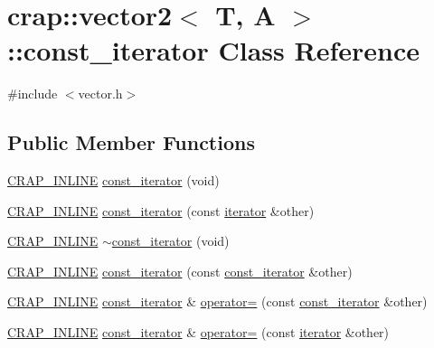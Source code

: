 \hypertarget{classcrap_1_1vector2_1_1const__iterator}{\section{crap\+:\+:vector2$<$ T, A $>$\+:\+:const\+\_\+iterator Class Reference}
\label{classcrap_1_1vector2_1_1const__iterator}
}


{\ttfamily \#include $<$vector.\+h$>$}

\subsection*{Public Member Functions}
\begin{DoxyCompactItemize}
\item 
\hyperlink{config__x86_8h_a5a40526b8d842e7ff731509998bb0f1c}{C\+R\+A\+P\+\_\+\+I\+N\+L\+I\+N\+E} \hyperlink{classcrap_1_1vector2_1_1const__iterator_a42c3e4138d9d8d95e6146e1da6b17b0f}{const\+\_\+iterator} (void)
\item 
\hyperlink{config__x86_8h_a5a40526b8d842e7ff731509998bb0f1c}{C\+R\+A\+P\+\_\+\+I\+N\+L\+I\+N\+E} \hyperlink{classcrap_1_1vector2_1_1const__iterator_a1f2d22e9110c31703f4bcb527244911f}{const\+\_\+iterator} (const \hyperlink{classcrap_1_1vector2_1_1iterator}{iterator} \&other)
\item 
\hyperlink{config__x86_8h_a5a40526b8d842e7ff731509998bb0f1c}{C\+R\+A\+P\+\_\+\+I\+N\+L\+I\+N\+E} \hyperlink{classcrap_1_1vector2_1_1const__iterator_a150ee4d884b9fd273a35729fce0c6a82}{$\sim$const\+\_\+iterator} (void)
\item 
\hyperlink{config__x86_8h_a5a40526b8d842e7ff731509998bb0f1c}{C\+R\+A\+P\+\_\+\+I\+N\+L\+I\+N\+E} \hyperlink{classcrap_1_1vector2_1_1const__iterator_a9c49a8974b33d2c059a62717c3837577}{const\+\_\+iterator} (const \hyperlink{classcrap_1_1vector2_1_1const__iterator}{const\+\_\+iterator} \&other)
\item 
\hyperlink{config__x86_8h_a5a40526b8d842e7ff731509998bb0f1c}{C\+R\+A\+P\+\_\+\+I\+N\+L\+I\+N\+E} \hyperlink{classcrap_1_1vector2_1_1const__iterator}{const\+\_\+iterator} \& \hyperlink{classcrap_1_1vector2_1_1const__iterator_af05764e60fbfd737b6e551730fe5a040}{operator=} (const \hyperlink{classcrap_1_1vector2_1_1const__iterator}{const\+\_\+iterator} \&other)
\item 
\hyperlink{config__x86_8h_a5a40526b8d842e7ff731509998bb0f1c}{C\+R\+A\+P\+\_\+\+I\+N\+L\+I\+N\+E} \hyperlink{classcrap_1_1vector2_1_1const__iterator}{const\+\_\+iterator} \& \hyperlink{classcrap_1_1vector2_1_1const__iterator_a87ca2c9ccd58405e7d3daa18c22cb044}{operator=} (const \hyperlink{classcrap_1_1vector2_1_1iterator}{iterator} \&other)

\end{DoxyCompactItemize}
